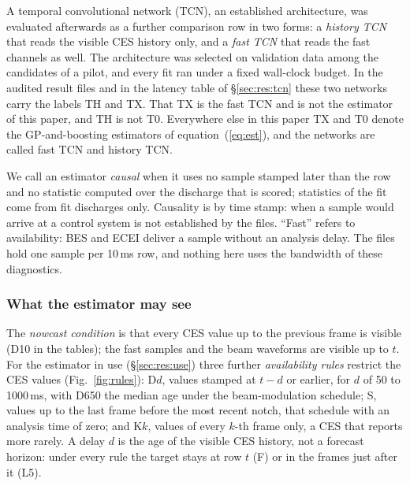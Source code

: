\documentclass[11pt,a4paper]{article}
\begin{document}
A temporal convolutional network (TCN), an established architecture, was evaluated afterwards as a further comparison row in two forms: a \emph{history TCN} that reads the visible CES history only, and a \emph{fast TCN} that reads the fast channels as well. The architecture was selected on validation data among the candidates of a pilot, and every fit ran under a fixed wall-clock budget. In the audited result files and in the latency table of \S\ref{sec:res:tcn} these two networks carry the labels TH and TX. That TX is the fast TCN and is not the estimator of this paper, and TH is not T0. Everywhere else in this paper TX and T0 denote the GP-and-boosting estimators of equation~(\ref{eq:est}), and the networks are called fast TCN and history TCN.

We call an estimator \emph{causal} when it uses no sample stamped later than the row and no statistic computed over the discharge that is scored; statistics of the fit come from fit discharges only. Causality is by time stamp: when a sample would arrive at a control system is not established by the files. ``Fast'' refers to availability: BES and ECEI deliver a sample without an analysis delay. The files hold one sample per 10\,ms row, and nothing here uses the bandwidth of these diagnostics.

\begin{table}[tbp]
  \centering
  \caption{Estimators and what they read (KSTAR). CES values are read as the availability rule allows; fast samples and beam waveforms up to row $t$.}
  \label{tab:inputs}
  \TabInputs
\end{table}

\subsubsection{What the estimator may see}
\label{sec:methods:rules}

The \emph{nowcast condition} is that every CES value up to the previous frame is visible (D10 in the tables); the fast samples and the beam waveforms are visible up to $t$. For the estimator in use (\S\ref{sec:res:use}) three further \emph{availability rules} restrict the CES values (Fig.~\ref{fig:rules}): D$d$, values stamped at $t - d$ or earlier, for $d$ of 50 to 1000\,ms, with D650 the median age under the beam-modulation schedule; S, values up to the last frame before the most recent notch, that schedule with an analysis time of zero; and K$k$, values of every $k$-th frame only, a CES that reports more rarely. A delay $d$ is the age of the visible CES history, not a forecast horizon: under every rule the target stays at row $t$ (F) or in the frames just after it (L5).
\end{document}
